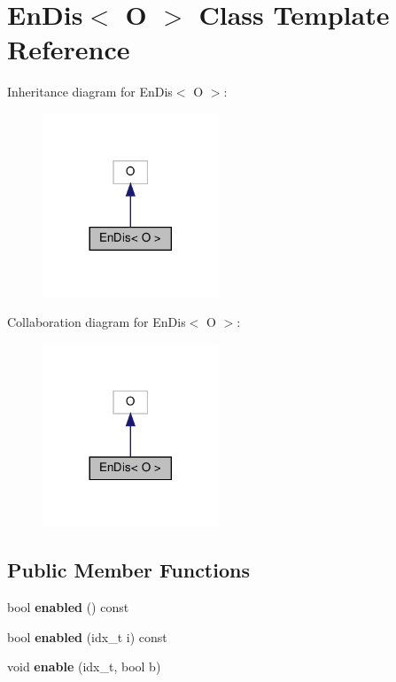 \hypertarget{classEnDis}{}\section{En\+Dis$<$ O $>$ Class Template Reference}
\label{classEnDis}


Inheritance diagram for En\+Dis$<$ O $>$\+:\nopagebreak
\begin{figure}[H]
\begin{center}
\leavevmode
\includegraphics[width=149pt]{classEnDis__inherit__graph}
\end{center}
\end{figure}


Collaboration diagram for En\+Dis$<$ O $>$\+:\nopagebreak
\begin{figure}[H]
\begin{center}
\leavevmode
\includegraphics[width=149pt]{classEnDis__coll__graph}
\end{center}
\end{figure}
\subsection*{Public Member Functions}
\begin{DoxyCompactItemize}
\item 
\mbox{\label{classEnDis_a8571bb08db08531cd31d6e1051ab484d}} 
bool {\bfseries enabled} () const
\item 
\mbox{\label{classEnDis_a70e85bc35dcc384f0fc1ed456da3ffc0}} 
bool {\bfseries enabled} (idx\+\_\+t i) const
\item 
\mbox{\label{classEnDis_a8371c78cffd3a88d27acdbd6ba215754}} 
void {\bfseries enable} (idx\+\_\+t, bool b)
\end{DoxyCompactItemize}
